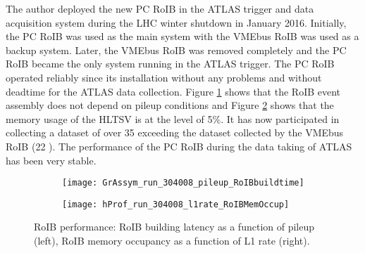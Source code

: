 The author deployed the new PC RoIB in the ATLAS trigger and data acquisition 
system during the LHC winter shutdown in January 2016. 
Initially, the PC RoIB was used as the main system with the VMEbus RoIB 
was used as a backup system. Later, the VMEbus RoIB was removed completely
and the PC RoIB became the only system running in the ATLAS trigger.
The PC RoIB operated reliably since its installation without any problems 
and without deadtime for the ATLAS data collection. 
Figure \ref{fig:roib.perf.buildtime} shows that
the RoIB event assembly does not depend on pileup conditions and
Figure \ref{fig:roib.perf.mem} shows that the 
memory usage of the HLTSV is at the level of 5\%.
It has now participated in collecting a dataset of over  35 \ifb exceeding 
the dataset collected by the VMEbus RoIB (22 \ifb).
The performance of the PC RoIB during the data taking of ATLAS has been 
very stable.



\begin{figure}[t!]
\centering
\begin{subfigure}[t]{0.48\textwidth}
\texttt{[image: GrAssym\_run\_304008\_pileup\_RoIBbuildtime]}
\subcaption{}
\label{fig:roib.perf.buildtime}
\end{subfigure}
\begin{subfigure}[t]{0.48\textwidth}
\texttt{[image: hProf\_run\_304008\_l1rate\_RoIBMemOccup]}
\subcaption{}
\label{fig:roib.perf.mem}
\end{subfigure}
\vspace{-0.25cm}
\caption{RoIB performance: RoIB building latency as a function of pileup (left), RoIB memory occupancy as a function of L1 rate (right).}
\label{fig:roib_pileup_l1rate}
\end{figure} 




